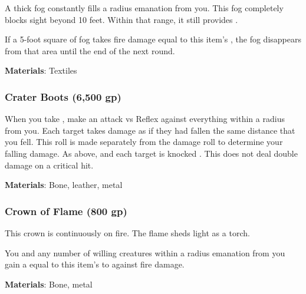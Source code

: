 A thick fog constantly fills a \areamed radius emanation from you.
This fog completely blocks sight beyond 10 feet.
Within that range, it still provides \concealment.

If a 5-foot square of fog takes fire damage equal to this item's , the fog disappears from that area until the end of the next round.



\vspace{0.25em}
\textbf{Materials}: Textiles


\lowercase{\hypertarget{item:Crater Boots}{}}\label{item:Crater Boots}
\hypertarget{item:Crater Boots}{\subsubsection{Crater Boots\hfill{} (6,500 gp)}}

When you take , make an attack vs Reflex against everything within a \areasmall radius from you.
\hit Each target takes damage as if they had fallen the same distance that you fell.
This roll is made separately from the damage roll to determine your falling damage.
\crit As above, and each target is knocked .
This does not deal double damage on a critical hit.



\vspace{0.25em}
\textbf{Materials}: Bone, leather, metal


\lowercase{\hypertarget{item:Crown of Flame}{}}\label{item:Crown of Flame}
\hypertarget{item:Crown of Flame}{\subsubsection{Crown of Flame\hfill{} (800 gp)}}

This crown is continuously on fire.
The flame sheds light as a torch.

You and any number of willing creatures within a \arealarge radius emanation from you
gain a  equal to this item's  to  against fire damage.



\vspace{0.25em}
\textbf{Materials}: Bone, metal


